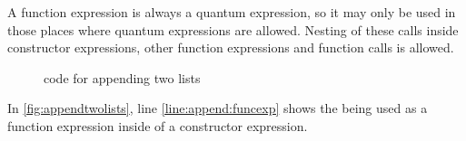 A function expression is always a quantum expression, so it may only be
used in those places where quantum expressions are allowed. Nesting of
these calls inside constructor expressions, other function expressions
and function calls is allowed.

\begin{figure}[htbp]

\caption{\lqpl{} code for appending two lists}\label{fig:appendtwolists}
\end{figure}

In \vref{fig:appendtwolists}, line \ref{line:append:funcexp} shows the 
 being used as a function expression inside of a
constructor expression.
